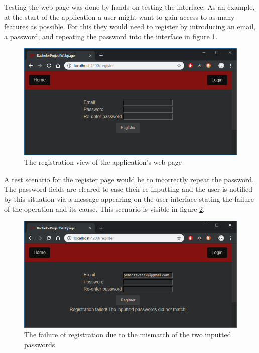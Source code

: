 \documentclass[12pt,a4paper,twoside]{report}
\begin{document}
Testing the web page was done by hands-on testing the interface. As an example, at the start of the application a user might want to gain access to as many features as possible. For this they would need to register by introducing an email, a password, and repeating the password into the interface in figure \ref{fig:web_page_register}.

\begin{figure}[ht]
  \centering
  \includegraphics[width=0.85\linewidth]{img/web_page_register.png}
  \caption[]{The registration view of the application's web page}
  \label{fig:web_page_register}
\end{figure}

A test scenario for the register page would be to incorrectly repeat the password. The password fields are cleared to ease their re-inputting and the user is notified by this situation via a message appearing on the user interface stating the failure of the operation and its cause. This scenario is visible in figure \ref{fig:web_page_register_pass_mismatch}.

\begin{figure}[ht]
  \centering
  \includegraphics[width=0.85\linewidth]{img/web_page_register_pass_mismatch.png}
  \caption[]{The failure of registration due to the mismatch of the two inputted passwords}
  \label{fig:web_page_register_pass_mismatch}
\end{figure}
\end{document}
